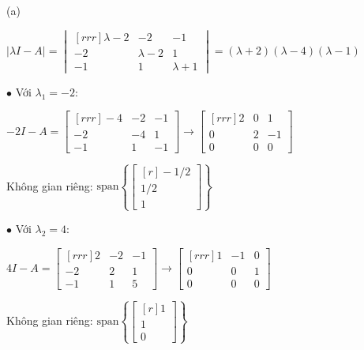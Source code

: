 \documentclass{article}
\begin{document}
    \begin{minipage}{0.48\linewidth}
    (a)

    $| \lambda I - A| = \begin{vmatrix}[rrr]
        \lambda - 2 & -2 & -1\\
        -2 & \lambda  - 2 & 1 \\
        -1 & 1 & \lambda  + 1 
    \end{vmatrix}  = ( \lambda  + 2 )( \lambda  - 4 )( \lambda - 1 )$

    $\bullet$ Với $ \lambda _1 = -2$:

    $-2I - A = \begin{bmatrix}[rrr]
        -4 & -2 & -1 \\
        -2 & -4 & 1 \\
        -1 & 1 & -1 
    \end{bmatrix} \to \begin{bmatrix}[rrr]
        2 & 0 & 1 \\
        0 & 2 & -1 \\
        0 & 0 & 0 
    \end{bmatrix}$

    Không gian riêng: $ \text{span} \left\{ \begin{bmatrix}[r]
        -1/2 \\
        1/2 \\
        1 
    \end{bmatrix}  \right\} $

    $\bullet$  Với $ \lambda _2 = 4$:

    $4I - A = \begin{bmatrix}[rrr]
        2 & -2 & -1 \\
        -2 & 2 & 1 \\
        -1 & 1 &  5
    \end{bmatrix} \to \begin{bmatrix}[rrr]
        1 & -1 & 0 \\
        0 & 0 & 1 \\
        0 & 0 & 0 
    \end{bmatrix} $

    Không gian riêng: $\text{span} \left\{ \begin{bmatrix}[r]
        1 \\
        1\\
        0 
    \end{bmatrix}  \right\}$


    \end{minipage} \hfill
\end{document}
